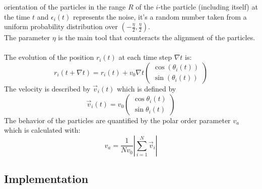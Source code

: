 \documentclass{article}
\begin{document}
orientation of the particles in the range $R$ of
 the $i$-the particle (including itself) at the time $t$ and $\epsilon_i(t)$ represents the noise, 
 it's a random number taken from a uniform probability distribution
over $\left(-\frac{\eta}{2}, \frac{\eta}{2}\right)$.\\
The parameter $\eta$ is the main tool that counteracts the alignment of the particles.\\
\\
The evolution of the position $r_i(t)$ at each time step $\nabla t$ is:
$$ r_i(t + \nabla t) = r_i(t) + v_0\nabla t \begin{pmatrix}
    \cos(\theta_i(t))\\
    \sin(\theta_i(t))
\end{pmatrix}$$
The velocity is described by $\vec{v}_i(t)$ which is defined by
$$\vec{v}_i(t) = v_0\begin{pmatrix}
    \cos\theta_i(t)\\
    \sin\theta_i(t)
\end{pmatrix}$$
The behavior of the particles are quantified by the polar order parameter $v_a$ which is calculated with:
$$v_a = \frac{1}{Nv_0}\left|\sum^{N}_{i=1}\vec{v}_i\right|$$

\subsection{Implementation}
\end{document}
